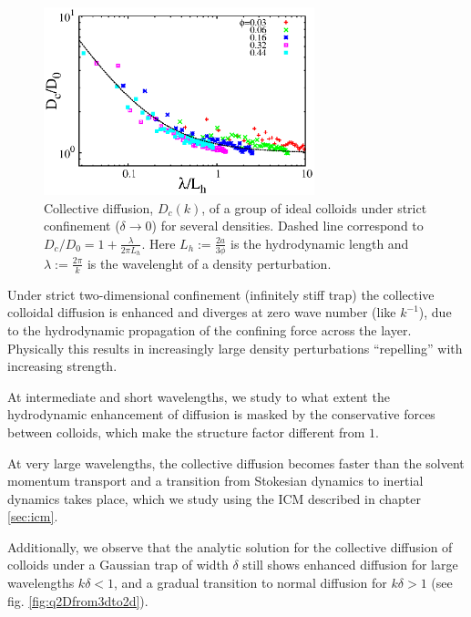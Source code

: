 \documentclass[ twoside,openright,titlepage,numbers=noenddot,%
headinclude,footinclude,cleardoublepage=empty,abstract=on,
BCOR=5mm,paper=a4,fontsize=11pt, dvipsnames
]{scrreprt}
\begin{document}
  \begin{figure}[H]
    \label{fig:q2DEnhancement}
    \centering
    \includegraphics[width=0.7\textwidth]{gfx/q2DEnhancement}
    \caption{Collective diffusion, $D_c(k)$, of a group of ideal colloids under strict confinement ($\delta\rightarrow 0$) for several densities. Dashed line correspond to $D_c/D_0 = 1 + \frac{\lambda}{2\pi L_h}$. Here $L_h := \frac{2a}{3\phi}$ is the hydrodynamic length and $\lambda := \frac{2\pi}{k}$ is the wavelenght of a density perturbation.}
  \end{figure}
  
  Under strict two-dimensional confinement (infinitely stiff trap) the collective colloidal diffusion is enhanced and diverges at zero wave number (like $k^{-1}$), due to the hydrodynamic propagation of the confining force across the layer. Physically this results in increasingly large density perturbations ``repelling'' with increasing strength.
  

  At intermediate and short wavelengths, we study to what extent the hydrodynamic enhancement of diffusion is masked by the conservative forces between colloids, which make the structure factor different from $1$. 
  
  At very large wavelengths, the collective diffusion becomes faster than the solvent momentum transport and a transition from Stokesian dynamics to inertial dynamics takes place, which we study using the \gls{ICM} described in chapter \ref{sec:icm}.

  Additionally, we observe that the analytic solution for the collective diffusion of colloids under a Gaussian trap of width $\delta$ still shows enhanced diffusion for large wavelengths $k\delta < 1$, and a gradual transition to normal diffusion for $k\delta > 1$ (see fig. \ref{fig:q2Dfrom3dto2d}).
\end{document}
